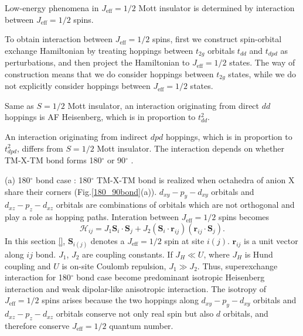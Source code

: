 \vspace{3mm}
Low-energy phenomena in $J_\mathrm{eff} = 1/2$ Mott insulator is determined by interaction between $J_\mathrm{eff} = 1/2$ spins.

To obtain interaction between $J_\mathrm{eff} = 1/2$ spins, first we construct spin-orbital exchange Hamiltonian by treating hoppings between $t_{2g}$ orbitals $t_{dd}$ and $t_{dpd}$ as perturbations, and then project the Hamiltonian to $J_\mathrm{eff} = 1/2$ states. The way of construction means that we do consider hoppings between $t_{2g}$ states, while we do not explicitly consider hoppings between $J_\mathrm{eff} = 1/2$ states.

Same as $S = 1/2$ Mott insulator, an interaction originating from direct $dd$ hoppings is AF Heisenberg, which is in proportion to $t_{dd}^2$.

An interaction originating from indirect $dpd$ hoppings, which is in proportion to $t_{dpd}^2$, differs from $S = 1/2$ Mott insulator.
The interaction depends on whether TM-X-TM bond forms 180$^\circ$ or 90$^\circ$ \cite{jackeli2009mott}.

(a) 180$^\circ$ bond case : 180$^\circ$ TM-X-TM bond is realized when octahedra of anion X share their corners (Fig.\ref{180_90bond}(a)).
$d_{xy}-p_y-d_{xy}$ orbitals and $d_{xz}-p_z-d_{xz}$ orbitals are combinations of orbitals which are not orthogonal and play a role as hopping paths.
Interation between $J_\mathrm{eff} = 1/2$ spins becomes
\begin{equation}
\mathcal{H}_{ij} = J_1\bm{S}_i\cdot\bm{S}_j + J_2(\bm{S}_i\cdot\bm{r}_{ij})(\bm{r}_{ij}\cdot\bm{S}_j).
\end{equation}
In this section \ref{}, $\bm{S}_{i(j)}$ denotes a $J_{\mathrm{eff}} = 1/2$ spin at site $i(j)$.
$\bm{r}_{ij}$ is a unit vector along $ij$ bond.
$J_1$, $J_2$ are coupling constants.
If $J_H \ll U$, where $J_H$ is Hund coupling and $U$ is on-site Coulomb repulsion, $J_1 \gg J_2$.
Thus, superexchange interaction for 180$^\circ$ bond case become predominant isotropic Heisenberg interaction and weak dipolar-like anisotropic interaction.
The isotropy of $J_\mathrm{eff} = 1/2$ spins arises because the two hoppings along $d_{xy}-p_y-d_{xy}$ orbitals and $d_{xz}-p_z-d_{xz}$ orbitals conserve not only real spin but also $d$ orbitals, and therefore conserve $J_\mathrm{eff} = 1/2$ quantum number.

